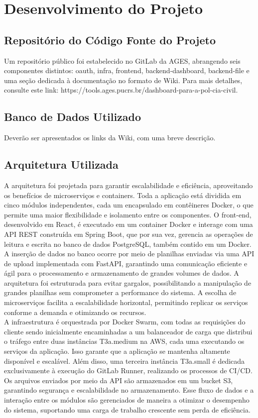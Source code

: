 \section[Desenvolvimento do Projeto]{Desenvolvimento do Projeto}

\subsection{Repositório do Código Fonte do Projeto}
Um repositório público foi estabelecido no GitLab da AGES, abrangendo seis componentes distintos: oauth, infra, frontend, backend-dashboard, backend-file e uma seção dedicada à documentação no formato de Wiki. Para mais detalhes, consulte este link: https://tools.ages.pucrs.br/dashboard-para-a-pol-cia-civil.

\subsection{Banco de Dados Utilizado}
  Deverão ser apresentados os links da Wiki, com uma breve descrição.

\subsection{Arquitetura Utilizada}
  A arquitetura foi projetada para garantir escalabilidade e eficiência, aproveitando os benefícios de microserviços e containers. Toda a aplicação está dividida em cinco módulos independentes, cada um encapsulado em contêineres Docker, o que permite uma maior flexibilidade e isolamento entre os componentes. O front-end, desenvolvido em React, é executado em um container Docker e interage com uma API REST construída em Spring Boot, que por sua vez, gerencia as operações de leitura e escrita no banco de dados PostgreSQL, também contido em um Docker.\\
A inserção de dados no banco ocorre por meio de planilhas enviadas via uma API de upload implementada com FastAPI, garantindo uma comunicação eficiente e ágil para o processamento e armazenamento de grandes volumes de dados. A arquitetura foi estruturada para evitar gargalos, possibilitando a manipulação de grandes planilhas sem comprometer a performance do sistema. A escolha de microserviços facilita a escalabilidade horizontal, permitindo replicar os serviços conforme a demanda e otimizando os recursos.\\
A infraestrutura é orquestrada por Docker Swarm, com todas as requisições do cliente sendo inicialmente encaminhadas a um balanceador de carga que distribui o tráfego entre duas instâncias T3a.medium na AWS, cada uma executando os serviços da aplicação. Isso garante que a aplicação se mantenha altamente disponível e escalável. Além disso, uma terceira instância T3a.small é dedicada exclusivamente à execução do GitLab Runner, realizando os processos de CI/CD.\\
Os arquivos enviados por meio da API são armazenados em um bucket S3, garantindo segurança e escalabilidade no armazenamento. Esse fluxo de dados e a interação entre os módulos são gerenciados de maneira a otimizar o desempenho do sistema, suportando uma carga de trabalho crescente sem perda de eficiência.


